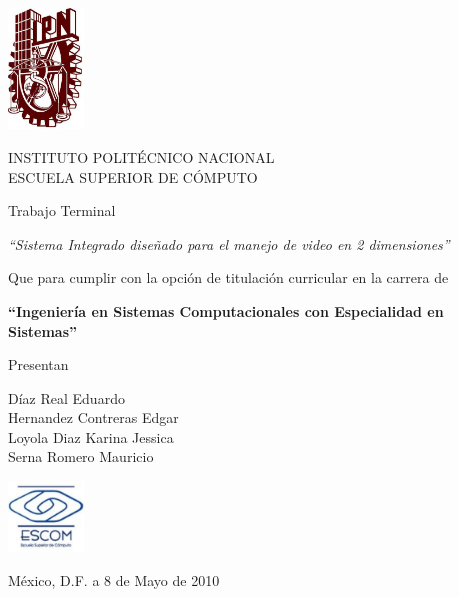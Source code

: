 
\begin{titlepage}

\begin{addmargin}[-1cm]{-3cm}
\begin{center}

\large

\hfill
\vfill

\includegraphics[width=2cm]{img/ipn.jpg}

\begingroup
\color{Maroon}
INSTITUTO POLITÉCNICO NACIONAL
\\
ESCUELA SUPERIOR DE CÓMPUTO
\endgroup

Trabajo Terminal

\emph{``Sistema Integrado diseñado para el manejo de video en 2 dimensiones''}

\vspace{2.5 cm}

Que para cumplir con la opción de titulación curricular en la carrera
de

\textbf{``Ingeniería en Sistemas Computacionales con Especialidad en Sistemas''}

\vspace{2.5 cm}

Presentan

{\small
Díaz Real Eduardo \\
Hernandez Contreras Edgar \\
Loyola Diaz Karina Jessica \\
Serna Romero Mauricio \\
}

\vspace{2.5 cm}

\includegraphics[width=2cm]{img/escom.png}

México, D.F. a 8 de Mayo de 2010

\vfill

\end{center}

\end{addmargin}

\end{titlepage}
